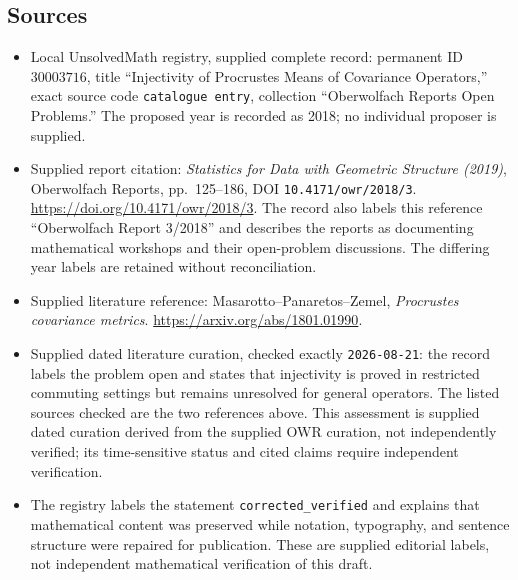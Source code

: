 \documentclass[11pt]{article}
\begin{document}
\subsection{Sources}
\begin{itemize}
\item Local UnsolvedMath registry, supplied complete record: permanent ID \(30003716\), title ``Injectivity of Procrustes Means of Covariance Operators,'' exact source code \texttt{catalogue entry}, collection ``Oberwolfach Reports Open Problems.'' The proposed year is recorded as 2018; no individual proposer is supplied.
\item Supplied report citation: \emph{Statistics for Data with Geometric Structure (2019)}, Oberwolfach Reports, pp.~125--186, DOI \texttt{10.4171/owr/2018/3}. \url{https://doi.org/10.4171/owr/2018/3}. The record also labels this reference ``Oberwolfach Report 3/2018'' and describes the reports as documenting mathematical workshops and their open-problem discussions. The differing year labels are retained without reconciliation.
\item Supplied literature reference: Masarotto--Panaretos--Zemel, \emph{Procrustes covariance metrics}. \url{https://arxiv.org/abs/1801.01990}.
\item Supplied dated literature curation, checked exactly \texttt{2026-08-21}: the record labels the problem open and states that injectivity is proved in restricted commuting settings but remains unresolved for general operators. The listed sources checked are the two references above. This assessment is supplied dated curation derived from the supplied OWR curation, not independently verified; its time-sensitive status and cited claims require independent verification.
\item The registry labels the statement \texttt{corrected\_verified} and explains that mathematical content was preserved while notation, typography, and sentence structure were repaired for publication. These are supplied editorial labels, not independent mathematical verification of this draft.
\end{itemize}
\end{document}
